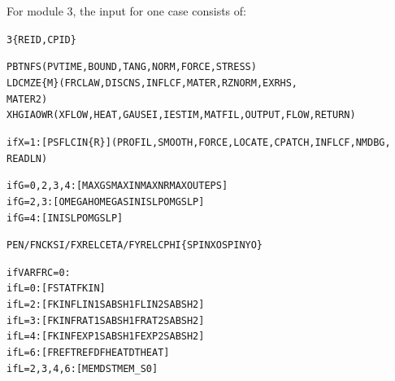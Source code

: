 \documentclass[12pt]{report}
\renewcommand{\magenta}[1]{}
\begin{document}
For module 3, the input for one case consists of:
\begin{alltt}\small
 3   \{REID, CPID\}    %


  PBTNFS                     (PVTIME, BOUND , TANG  , NORM  , FORCE , STRESS)
  LDCMZE  \{\magenta{M}M\}                (FRCLAW, DISCNS, INFLCF, MATER , RZNORM, EXRHS ,
                                                              \magenta{MATER3,} MATER2)
XHGIAOWR     (XFLOW , HEAT  , GAUSEI, IESTIM, MATFIL, OUTPUT, FLOW  , RETURN)


if X=1: [ PSFLCIN \{R\} ] (PROFIL, SMOOTH, FORCE, LOCATE, CPATCH, INFLCF, NMDBG,
                                                                        READLN)


if G=0,2,3,4: [ MAXGS   MAXIN   MAXNR   MAXOUT  EPS     ]
if G=2,3:     [ OMEGAH  OMEGAS  INISLP  OMGSLP          ]
if G=4:       [ INISLP  OMGSLP                          ]
\magenta{if G=5:       [ FDECAY  BETATH  KDOWFB  D\_IFC   D\_LIN   D\_CNS   D\_SLP   POW\_S ]
}

PEN/FN  CKSI/FXREL  CETA/FYREL  CPHI   \{SPINXO   SPINYO\}


if VARFRC=0:
      if L=0: [ FSTAT  FKIN                                ]
      if L=2: [ FKIN   FLIN1  SABSH1  FLIN2  SABSH2        ]
      if L=3: [ FKIN   FRAT1  SABSH1  FRAT2  SABSH2        ]
      if L=4: [ FKIN   FEXP1  SABSH1  FEXP2  SABSH2        ]
      if L=6: [ FREF   TREF   DFHEAT  DTHEAT               ]
if L=2,3,4,6: [ MEMDST MEM\_S0                              ]


\end{alltt}
\end{document}
